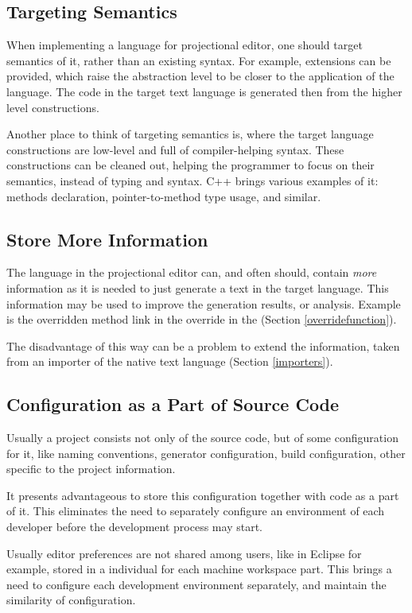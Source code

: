 \subsection{Targeting Semantics}

 When implementing a language for projectional editor, one should target semantics of it, rather than an existing syntax.
For example, extensions can be provided, which raise the abstraction level to be closer to the application of the language.
The code in the target text language is generated then from the higher level constructions. 

Another place to think of targeting semantics is, where the target language constructions are low-level and 
full of compiler-helping syntax. These constructions can be cleaned out, helping the programmer to focus on their
semantics, instead of typing and syntax. C++ brings various examples of it:  methods declaration, 
pointer-to-method type usage, and similar.

\subsection{Store More Information}

 The language in the projectional editor can, and often should, contain \emph{more} information as it is needed 
 to just generate a text in the target language. This information may be used to improve the generation results, or
 analysis. Example is the overridden method link in the override in the \pcpp (Section \ref{overridefunction}).
 
 The disadvantage of this way can be a problem to extend the information, taken from an importer of the native text language (Section \ref{importers}).

\subsection{Configuration as a Part of Source Code}
 Usually a project consists not only of the source code, but of some configuration for it, like naming conventions, 
 generator configuration, build configuration, other specific to the project information.
 
 It presents advantageous to store this configuration together with code as a part of it. This eliminates the need 
 to separately configure an environment of each developer before the development process may start.

 Usually editor preferences are not shared among users, like in Eclipse for example, stored in a individual for each 
 machine workspace part. This brings a need to configure each development environment separately, and maintain the similarity
 of configuration.
 
